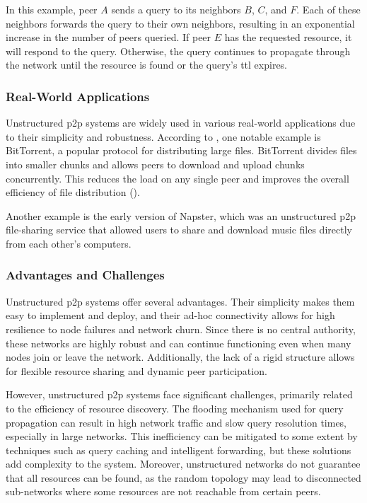 In this example, peer $A$ sends a query to its neighbors $B$, $C$, and $F$.
Each of these neighbors forwards the query to their own neighbors, resulting in an exponential increase in the number of peers queried.
If peer $E$ has the requested resource, it will respond to the query.
Otherwise, the query continues to propagate through the network until the resource is found or the query's \gls{ttl} expires.

\subsubsection*{Real-World Applications}
Unstructured \gls{p2p} systems are widely used in various real-world applications due to their simplicity and robustness.
According to \cite{BitTorrent2005}, one notable example is BitTorrent, a popular protocol for distributing large files.
BitTorrent divides files into smaller chunks and allows peers to download and upload chunks concurrently.
This reduces the load on any single peer and improves the overall efficiency of file distribution (\cite{cohen2003incentives}).

Another example is the early version of Napster, which was an unstructured \gls{p2p} file-sharing service that allowed users to share and download music files directly from each other's computers.

\subsubsection*{Advantages and Challenges}
Unstructured \gls{p2p} systems offer several advantages.
Their simplicity makes them easy to implement and deploy, and their ad-hoc connectivity allows for high resilience to node failures and network churn.
Since there is no central authority, these networks are highly robust and can continue functioning even when many nodes join or leave the network.
Additionally, the lack of a rigid structure allows for flexible resource sharing and dynamic peer participation.

However, unstructured \gls{p2p} systems face significant challenges, primarily related to the efficiency of resource discovery.
The flooding mechanism used for query propagation can result in high network traffic and slow query resolution times, especially in large networks.
This inefficiency can be mitigated to some extent by techniques such as query caching and intelligent forwarding, but these solutions add complexity to the system.
Moreover, unstructured networks do not guarantee that all resources can be found, as the random topology may lead to disconnected sub-networks where some resources are not reachable from certain peers.

